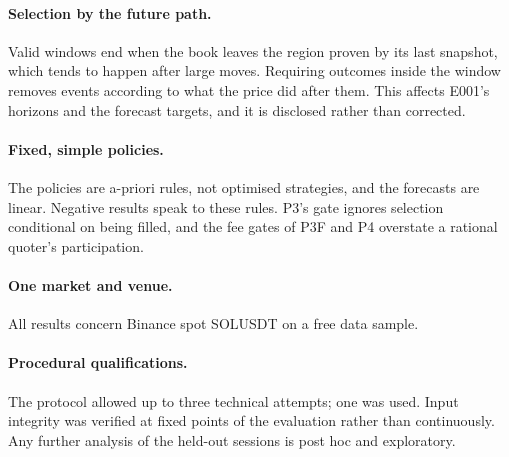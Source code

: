 \documentclass[11pt]{article}
\makeatletter
\renewcommand\section{\@startsection{section}{1}{\z@}{-3.25ex\@plus -1ex \@minus -.2ex}{1.5ex \@plus .2ex}{\normalfont\large\bfseries}}
\makeatother
\begin{document}
\paragraph{Selection by the future path.} Valid windows end when the book leaves the region proven by its last snapshot,
which tends to happen after large moves. Requiring outcomes inside the window removes events according to what the price
did after them. This affects E001's horizons and the forecast targets, and it is disclosed rather than corrected.

\paragraph{Fixed, simple policies.} The policies are a-priori rules, not optimised strategies, and the forecasts are
linear. Negative results speak to these rules. P3's gate ignores selection conditional on being filled, and the fee gates
of P3F and P4 overstate a rational quoter's participation.

\paragraph{One market and venue.} All results concern Binance spot SOLUSDT on a free data sample.

\paragraph{Procedural qualifications.} The protocol allowed up to three technical attempts; one was used. Input
integrity was verified at fixed points of the evaluation rather than continuously. Any further analysis of the held-out
sessions is post hoc and exploratory.

\section{Conclusion}\label{sec:conclusion}
\end{document}
